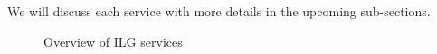 We will discuss each service with more details in the upcoming sub-sections.

\begin{figure}[H]
	\centering
	\caption{Overview of ILG services}
	\label{fig:services-overview}
\end{figure}

